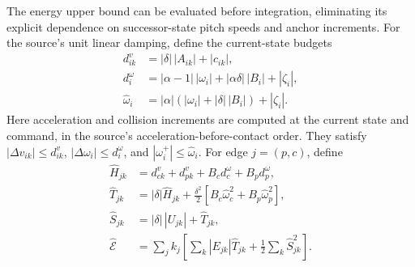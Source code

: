 The energy upper bound can be evaluated before integration, eliminating its explicit dependence on successor-state pitch speeds and anchor increments.
For the source's unit linear damping, define the current-state budgets
\begin{align}
 d^v_{ik}&=|\delta|\,|A_{ik}|+|c_{ik}|,\nonumber\\
 d^\omega_i&=|\alpha-1|\,|\omega_i|+|\alpha\delta|\,|B_i|+|\zeta_i|,\nonumber\\
 \widehat\omega_i&=|\alpha|(|\omega_i|+|\delta|\,|B_i|)+|\zeta_i|.
 \label{eq:current_velocity_budgets}
\end{align}
Here acceleration and collision increments are computed at the current state and command, in the source's acceleration-before-contact order.
They satisfy $|\Delta v_{ik}|\le d^v_{ik}$, $|\Delta\omega_i|\le d^\omega_i$, and $|\omega_i^+|\le\widehat\omega_i$.
For edge $j=(p,c)$, define
\begin{align}
 \widehat H_{jk}&=d^v_{ck}+d^v_{pk}+B_cd^\omega_c+B_pd^\omega_p,\nonumber\\
 \widehat T_{jk}&=|\delta|\widehat H_{jk}+\tfrac{\delta^2}{2}
  [B_c\widehat\omega_c^2+B_p\widehat\omega_p^2],\nonumber\\
 \widehat S_{jk}&=|\delta|\,|U_{jk}|+\widehat T_{jk},\nonumber\\
 \widehat{\mathcal E}&=\sum_jk_j\left[
 \sum_k|E_{jk}|\widehat T_{jk}+\tfrac12\sum_k\widehat S_{jk}^2\right].
 \label{eq:current_elastic_budget}
\end{align}

